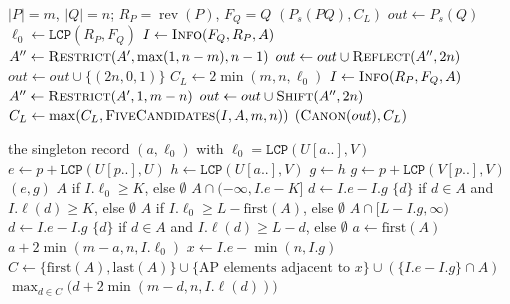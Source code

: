 ﻿\documentclass[11pt]{article}
\theoremstyle{plain}
\theoremstyle{remark}
\begin{document}
\begin{algorithm}[H]
\caption{$\textsc{SuffixMerge}(S_P,S_Q)$: palindromic suffixes and $C_L$}
\label{alg:suffix}
\begin{algorithmic}[1]
\Require $|P|=m$, $|Q|=n$; $R_P=\operatorname{rev}(P)$, $F_Q=Q$
\Ensure $(P_s(PQ),C_L)$
\State $out\gets P_s(Q)$ 
\State $\ell_0\gets\texttt{LCP}(R_P,F_Q)$
  \State $I\gets\textsc{Info}(F_Q,R_P,A)$
    \State $A''\gets\textsc{Restrict}(A',\max(1,n-m),n-1)$
      \State $out\gets out\cup\textsc{Reflect}(A'',2n)$
    \EndIf
  \EndFor
\EndFor
{}
  \State $out\gets out\cup\{(2n,0,1)\}$
\EndIf
\State $C_L\gets2\min(m,n,\ell_0)$ 
  \State $I\gets\textsc{Info}(R_P,F_Q,A)$
    \State $A''\gets\textsc{Restrict}(A',1,m-n)$
      \State $out\gets out\cup\textsc{Shift}(A'',2n)$
    \EndIf
  \EndFor
  \State $C_L\gets\max(C_L,\textsc{FiveCandidates}(I,A,m,n))$
\EndFor
\State \Return $(\textsc{Canon}(out),C_L)$
\end{algorithmic}
\end{algorithm}

\begin{algorithm}[H]\footnotesize
\caption{Periodic-family information, filters and five candidates}
\label{alg:info}
\begin{algorithmic}[1]
    \State \Return the singleton record $(a,\ell_0)$ with
           $\ell_0=\texttt{LCP}(U[a..],V)$
  \EndIf
  \State $e\gets p+\texttt{LCP}(U[p..],U)$
  \State $h\gets\texttt{LCP}(U[a..],V)$
    \State $g\gets h$
  \Else
    \State $g\gets p+\texttt{LCP}(V[p..],V)$
  \EndIf
  \State \Return $(e,g)$ 
\EndFunction
{}
    \State \Return $A$ if $I.\ell_0\ge K$, else $\emptyset$
  \EndIf
    \State \Return $A\cap(-\infty,I.e-K]$
  \EndIf
  \State $d\gets I.e-I.g$
  \State \Return $\{d\}$ if $d\in A$ and $I.\ell(d)\ge K$, else $\emptyset$
\EndFunction
{}
    \State \Return $A$ if $I.\ell_0\ge L-\text{first}(A)$, else $\emptyset$
  \EndIf
    \State \Return $A\cap[L-I.g,\infty)$
  \EndIf
  \State $d\gets I.e-I.g$
  \State \Return $\{d\}$ if $d\in A$ and $I.\ell(d)\ge L-d$, else $\emptyset$
\EndFunction
{}
    \State $a\gets\text{first}(A)$
    \State \Return $a+2\min(m-a,n,I.\ell_0)$
  \EndIf
  \State $x\gets I.e-\min(n,I.g)$
  \State $C\gets\{\text{first}(A),\text{last}(A)\}\cup
         \{\text{AP elements adjacent to }x\}\cup(\{I.e-I.g\}\cap A)$
  \State \Return $\max_{d\in C}\bigl(d+2\min(m-d,n,I.\ell(d))\bigr)$
\EndFunction
\end{algorithmic}
\end{algorithm}
\end{document}
